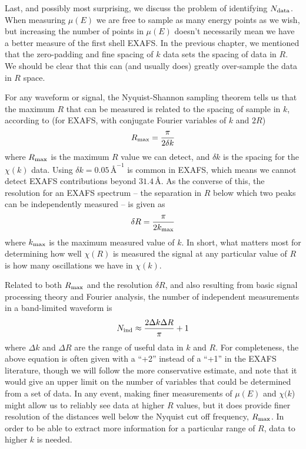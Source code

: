 Last, and possibly most surprising, we discuss the problem of identifying
$N_{\rm data}$.  When measuring $\mu(E)$ we are free to sample as many
energy points as we wish, but increasing the number of points in $\mu(E)$
doesn't necessarily mean we have a better measure of the first shell EXAFS.
In the previous chapter, we mentioned that the zero-padding and fine
spacing of $k$ data sets the spacing of data in $R$.  We should be clear
that this can (and usually does) greatly over-sample the data in $R$ space.


For any waveform or signal, the Nyquist-Shannon sampling theorem tells us
that the maximum $R$ that can be measured is related to the spacing of
sample in $k$, according to (for EXAFS, with conjugate Fourier variables of
$k$ and $2R$)
\begin{equation}
  R_{\rm max} = \frac{\pi}{2\delta k}
  \label{Eq:FIT:rmax}
\end{equation}
\noindent
where $R_{\rm max}$ is the maximum $R$ value we can detect, and $\delta k$
is the spacing for the $\chi(k)$ data.  Using $\delta k =
0.05\,\text{\AA}^{-1}$ is common in EXAFS, which means we cannot detect EXAFS
contributions beyond $31.4\, \text{\AA}$.  As the converse of this, the
resolution for an EXAFS spectrum -- the separation in $R$ below which two
peaks can be independently measured -- is given as
\begin{equation}
  \delta R = \frac{\pi}{2k_{\rm max}}
  \label{Eq:FIT:rres}
\end{equation}
\noindent
where $k_{\rm max}$ is the maximum measured value of $k$.  In short, what
matters most for determining how well $\chi(R)$ is measured the signal at
any particular value of $R$ is how many oscillations we have in $\chi(k)$.

Related to both $R_{\rm max}$ and the resolution $\delta R$, and also
resulting from basic signal processing theory and Fourier analysis, the
number of independent measurements in a band-limited waveform is
\begin{equation}
  N_{\rm ind} \approx \frac{2 \Delta k \Delta R}{\pi} + 1
  \label{Eq:FIT:nidp}
\end{equation}
\noindent
where $\Delta k$ and $\Delta R$ are the range of useful data in $k$ and
$R$.  For completeness, the above equation is often given with a ``+2''
instead of a ``+1''\cite{Stern93} in the EXAFS literature, though we will
follow the more conservative estimate, and note that it would give an upper
limit on the number of variables that could be determined from a set of
data.  In any event, making finer measurements of $\mu(E)$ and $\chi(k$)
might allow us to reliably see data at higher $R$ values, but it does
provide finer resolution of the distances well below the Nyquist cut off
frequency, $R_{\rm max}$.  In order to be able to extract more information
for a particular range of $R$, data to higher $k$ is needed.


